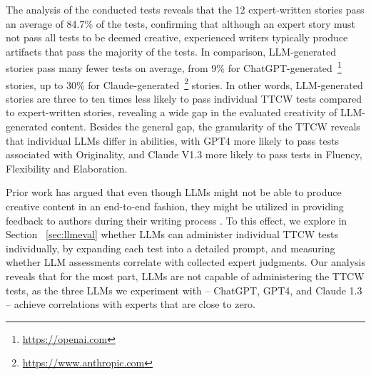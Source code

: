 The analysis of the conducted tests reveals that the 12 expert-written stories pass an average of 84.7\% of the tests, confirming that although an expert story must not pass all tests to be deemed creative, experienced writers typically produce artifacts that pass the majority of the tests. In comparison, LLM-generated stories pass many fewer tests on average, from 9\% for ChatGPT-generated~\footnote{\url{https://openai.com}} stories, up to 30\% for Claude-generated~\footnote{\url{https://www.anthropic.com}} stories. In other words, LLM-generated stories are three to ten times less likely to pass individual TTCW tests compared to expert-written stories, revealing a wide gap in the evaluated creativity of LLM-generated content. Besides the general gap, the granularity of the TTCW reveals that individual LLMs differ in abilities, with GPT4 more likely to pass tests associated with Originality, and Claude V1.3 more likely to pass tests in Fluency, Flexibility and Elaboration.

Prior work has argued that even though LLMs might not be able to produce creative content in an end-to-end fashion, they might be utilized in providing feedback to authors during their writing process \cite{ippolito2022creative}. To this effect, we explore in Section ~\ref{sec:llmeval} whether LLMs can administer individual TTCW tests individually, by expanding each test into a detailed prompt, and measuring whether LLM assessments correlate with collected expert judgments. Our analysis reveals that for the most part, LLMs are not capable of administering the TTCW tests, as the three LLMs we experiment with -- ChatGPT, GPT4, and Claude 1.3 -- achieve correlations with experts that are close to zero.

